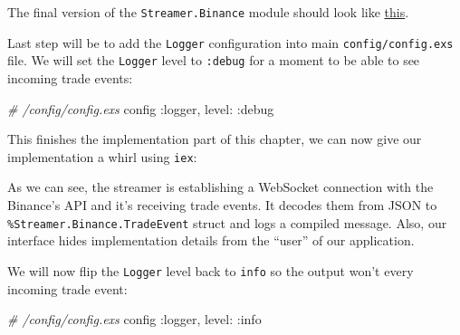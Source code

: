 \documentclass[
  oneside]{book}
\newenvironment{Shaded}{\begin{snugshade}}{\end{snugshade}}
\newcommand{\AttributeTok}[1]{\textcolor[rgb]{0.77,0.63,0.00}{#1}}
\newcommand{\CommentTok}[1]{\textcolor[rgb]{0.56,0.35,0.01}{\textit{#1}}}
\newcommand{\ErrorTok}[1]{\textcolor[rgb]{0.64,0.00,0.00}{\textbf{#1}}}
\newcommand{\ExtensionTok}[1]{#1}
\newcommand{\KeywordTok}[1]{\textcolor[rgb]{0.13,0.29,0.53}{\textbf{#1}}}
\newcommand{\NormalTok}[1]{#1}
\newcommand{\OperatorTok}[1]{\textcolor[rgb]{0.81,0.36,0.00}{\textbf{#1}}}
\newcommand{\StringTok}[1]{\textcolor[rgb]{0.31,0.60,0.02}{#1}}
\newcommand{\VariableTok}[1]{\textcolor[rgb]{0.00,0.00,0.00}{#1}}
\begin{document}
The final version of the \texttt{Streamer.Binance} module should look like \href{https://github.com/frathon/create-a-cryptocurrency-trading-bot-in-elixir-source-code/blob/chapter_01/apps/streamer/lib/streamer/binance.ex}{this}.

Last step will be to add the \texttt{Logger} configuration into main \texttt{config/config.exs} file. We will set the \texttt{Logger} level to \texttt{:debug} for a moment to be able to see incoming trade events:

\begin{Shaded}
\begin{Highlighting}[]
\CommentTok{\# /config/config.exs}
\NormalTok{config }\VariableTok{:logger}\NormalTok{,}
  \VariableTok{level:} \VariableTok{:debug}
\end{Highlighting}
\end{Shaded}

This finishes the implementation part of this chapter, we can now give our implementation a whirl using \texttt{iex}:

\begin{Shaded}
\end{Shaded}

As we can see, the streamer is establishing a WebSocket connection with the Binance's API and it's receiving trade events. It decodes them from JSON to \texttt{\%Streamer.Binance.TradeEvent} struct and logs a compiled message. Also, our interface hides implementation details from the ``user'' of our application.

We will now flip the \texttt{Logger} level back to \texttt{info} so the output won't every incoming trade event:

\begin{Shaded}
\begin{Highlighting}[]
\CommentTok{\# /config/config.exs}
\NormalTok{config }\VariableTok{:logger}\NormalTok{,}
  \VariableTok{level:} \VariableTok{:info}
\end{Highlighting}
\end{Shaded}
\end{document}
